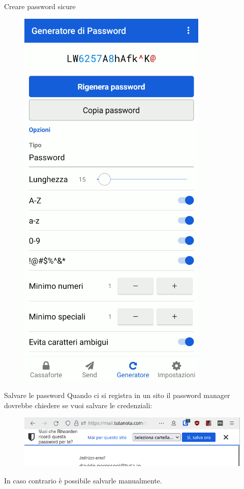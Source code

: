 \begin{myframe}{Creare password sicure}
  \begin{figure}
    \includegraphics[height=.8\paperheight]{img/generatepass}
  \end{figure}
\end{myframe}

\begin{myframe}{Salvare le password}
  Quando ci si registra in un sito il password manager dovrebbe chiedere se vuoi salvare le credenziali:

  \begin{figure}
    \includegraphics[width=\textwidth]{img/savepass}
  \end{figure}

  \medskip\pause
  In caso contrario è possibile salvarle manualmente.
\end{myframe}

